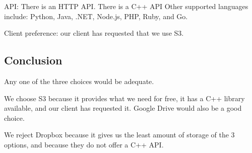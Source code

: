 \documentclass[onecolumn, draftclsnofoot,10pt, compsoc]{IEEEtran}
\begin{document}
API: There is an HTTP API. There is a C++ API \cite{aws-sdk}
Other supported languages include: Python, Java, .NET, Node.js, PHP, Ruby, and Go.

Client preference: our client has requested that we use S3.


\subsection{ Conclusion }

Any one of the three choices would be adequate.

We choose S3 because it provides what we need for free, it has a C++ library available, and our client has requested it. Google Drive would also be a good choice.

We reject Dropbox because it gives us the least amount of storage of the 3 options, and because they do not offer a C++ API.

\newpage


{}

\nocite{*}
\end{document}
